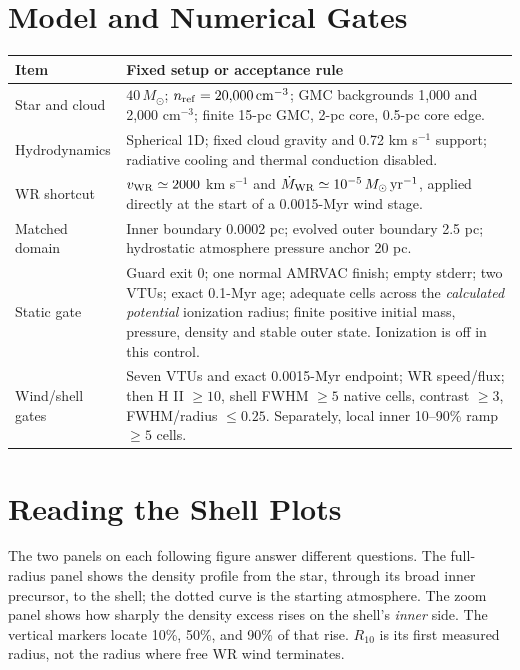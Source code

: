 \documentclass[10pt,letterpaper]{article}
\begin{document}
\section{Model and Numerical Gates}
\begingroup\small\renewcommand{\arraystretch}{1.08}
\begin{tabularx}{\textwidth}{@{}p{}>{\raggedright\arraybackslash}X@{}}
\toprule
Item & Fixed setup or acceptance rule \\
\midrule
Star and cloud & $40\,M_\odot$; $n_{\rm ref}=20{,}000\,{\rm cm}^{-3}$; GMC backgrounds 1,000 and 2,000 $\mathrm{cm}^{-3}$; finite 15-pc GMC, 2-pc core, 0.5-pc core edge. \\
Hydrodynamics & Spherical 1D; fixed cloud gravity and 0.72 km s$^{-1}$ support; radiative cooling and thermal conduction disabled. \\
WR shortcut & $v_{\rm WR}\simeq 2000$ km s$^{-1}$ and $\dot M_{\rm WR}\simeq10^{-5}\,M_\odot\,{\rm yr}^{-1}$, applied directly at the start of a 0.0015-Myr wind stage. \\
Matched domain & Inner boundary 0.0002 pc; evolved outer boundary 2.5 pc; hydrostatic atmosphere pressure anchor 20 pc. \\
Static gate & Guard exit 0; one normal AMRVAC finish; empty stderr; two VTUs; exact 0.1-Myr age; adequate cells across the \emph{calculated potential} ionization radius; finite positive initial mass, pressure, density and stable outer state. Ionization is off in this control. \\
Wind/shell gates & Seven VTUs and exact 0.0015-Myr endpoint; WR speed/flux; then H II $\geq10$, shell FWHM $\geq5$ native cells, contrast $\geq3$, FWHM/radius $\leq0.25$. Separately, local inner 10--90\% ramp $\geq5$ cells. \\
\bottomrule
\end{tabularx}
\endgroup

\section{Reading the Shell Plots}
The two panels on each following figure answer different questions. The full-radius panel shows the density profile from the star, through its broad inner precursor, to the shell; the dotted curve is the starting atmosphere. The zoom panel shows how sharply the density excess rises on the shell's \emph{inner} side. The vertical markers locate 10\%, 50\%, and 90\% of that rise. $R_{10}$ is its first measured radius, not the radius where free WR wind terminates.
\end{document}
